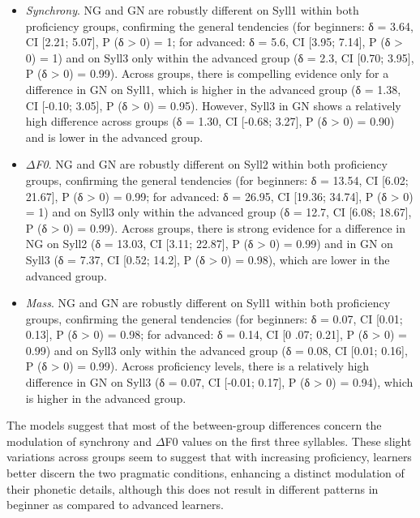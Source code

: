 \begin{itemize}
\item \textit{Synchrony}. NG and GN are robustly different on Syll1 within both proficiency groups, confirming the general tendencies (for beginners: δ = 3.64, CI [2.21; 5.07], P (δ > 0) = 1; for advanced: δ = 5.6, CI [3.95; 7.14], P (δ > 0) = 1) and on Syll3 only within the advanced group (δ = 2.3, CI [0.70; 3.95], P (δ > 0) = 0.99). Across groups, there is compelling evidence only for a difference in GN on Syll1, which is higher in the advanced group (δ = 1.38, CI [-0.10; 3.05], P (δ > 0) = 0.95). However, Syll3 in GN shows a relatively high difference across groups (δ = 1.30, CI [-0.68; 3.27], P (δ > 0) = 0.90) and is lower in the advanced group.
\item \textit{${\Delta}$F0}. NG and GN are robustly different on Syll2 within both proficiency groups, confirming the general tendencies (for beginners: δ = 13.54, CI [6.02; 21.67], P (δ > 0) = 0.99; for advanced: δ = 26.95, CI [19.36; 34.74], P (δ > 0) = 1) and on Syll3 only within the advanced group (δ = 12.7, CI [6.08; 18.67], P (δ > 0) = 0.99). Across groups, there is strong evidence for a difference in NG on Syll2 (δ = 13.03, CI [3.11; 22.87], P (δ > 0) = 0.99) and in GN on Syll3 (δ = 7.37, CI [0.52; 14.2], P (δ > 0) = 0.98), which are lower in the advanced group.
\item \textit{Mass}. NG and GN are robustly different on Syll1 within both proficiency groups, confirming the general tendencies (for beginners: δ = 0.07, CI [0.01; 0.13], P (δ > 0) = 0.98; for advanced: δ = 0.14, CI [0 .07; 0.21], P (δ > 0) = 0.99) and on Syll3 only within the advanced group (δ = 0.08, CI [0.01; 0.16], P (δ > 0) = 0.99). Across proficiency levels, there is a relatively high difference in GN on Syll3 (δ = 0.07, CI [-0.01; 0.17], P (δ > 0) = 0.94), which is higher in the advanced group.
\end{itemize}

The models suggest that most of the between-group differences concern the modulation of synchrony and ${\Delta}$F0 values on the first three syllables. These slight variations across groups seem to suggest that with increasing proficiency, learners better discern the two pragmatic conditions, enhancing a distinct modulation of their phonetic details, although this does not result in different patterns in beginner as compared to advanced learners.

